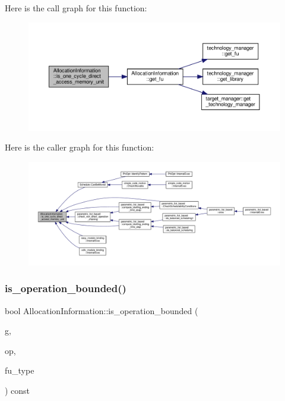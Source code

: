 Here is the call graph for this function\+:
\nopagebreak
\begin{figure}[H]
\begin{center}
\leavevmode
\includegraphics[width=350pt]{d7/d79/classAllocationInformation_a0770d67171506fb5f5c27a3d5c57f174_cgraph}
\end{center}
\end{figure}
Here is the caller graph for this function\+:
\nopagebreak
\begin{figure}[H]
\begin{center}
\leavevmode
\includegraphics[width=350pt]{d7/d79/classAllocationInformation_a0770d67171506fb5f5c27a3d5c57f174_icgraph}
\end{center}
\end{figure}
\mbox{\label{classAllocationInformation_aad2976199807a359f2d1b79c6d4481e4}} 
\subsubsection{\texorpdfstring{is\+\_\+operation\+\_\+bounded()}{is\_operation\_bounded()}\hspace{0.1cm}{\footnotesize\ttfamily [1/3]}}
{\footnotesize\ttfamily bool Allocation\+Information\+::is\+\_\+operation\+\_\+bounded (\begin{DoxyParamCaption}\item[{const \hyperlink{op__graph_8hpp_a9a0b240622c47584bee6951a6f5de746}{Op\+Graph\+Const\+Ref}}]{g,  }\item[{const \hyperlink{graph_8hpp_abefdcf0544e601805af44eca032cca14}{vertex} \&}]{op,  }\item[{unsigned int}]{fu\+\_\+type }\end{DoxyParamCaption}) const}



